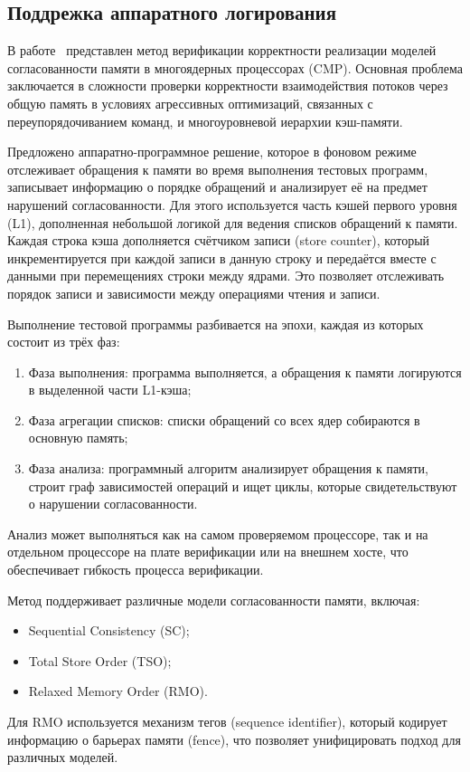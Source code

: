 \subsection{Поддрежка аппаратного логирования}
\label{sec:post-silicon}

В работе~\cite{post-silicon} представлен метод
верификации корректности реализации моделей согласованности памяти в
многоядерных процессорах (CMP). Основная проблема заключается в
сложности проверки корректности взаимодействия потоков через общую
память в условиях агрессивных оптимизаций, связанных с
переупорядочиванием команд, и многоуровневой иерархии кэш-памяти.

Предложено аппаратно-программное решение, которое в фоновом режиме
отслеживает обращения к памяти во время выполнения тестовых программ,
записывает информацию о порядке обращений и анализирует её на предмет
нарушений согласованности. Для этого используется часть кэшей первого
уровня (L1), дополненная небольшой логикой для ведения списков
обращений к памяти. Каждая строка кэша дополняется счётчиком записи
(store counter), который инкрементируется при каждой записи в данную
строку и передаётся вместе с данными при перемещениях строки между
ядрами. Это позволяет отслеживать порядок записи и зависимости между
операциями чтения и записи.

Выполнение тестовой программы разбивается на эпохи, каждая из которых
состоит из трёх фаз:
\begin{enumerate}
  \item Фаза выполнения: программа выполняется, а обращения к памяти
    логируются в выделенной части L1-кэша;
  \item Фаза агрегации списков: списки обращений со всех ядер
    собираются в основную память;
  \item Фаза анализа: программный алгоритм анализирует обращения к
    памяти, строит граф зависимостей операций и ищет циклы, которые
    свидетельствуют о нарушении согласованности.
\end{enumerate}

Анализ может выполняться как на самом проверяемом процессоре, так и
на отдельном процессоре на плате верификации или на внешнем хосте,
что обеспечивает гибкость процесса верификации.

Метод поддерживает различные модели согласованности памяти, включая:
\begin{itemize}
  \item Sequential Consistency (SC);
  \item Total Store Order (TSO);
  \item Relaxed Memory Order (RMO).
\end{itemize}
Для RMO используется механизм тегов (sequence identifier), который
кодирует информацию о барьерах памяти (fence), что позволяет
унифицировать подход для различных моделей.

